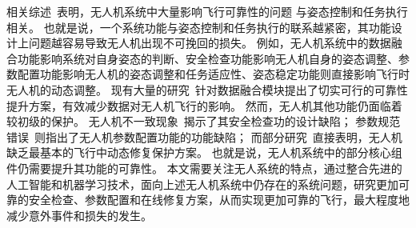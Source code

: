 相关综述~\cite{derhab2023internet,omolara2023drone}表明，无人机系统中大量影响飞行可靠性的问题
与姿态控制和任务执行相关。
也就是说，一个系统功能与姿态控制和任务执行的联系越紧密，其功能设计上问题越容易导致无人机出现不可挽回的损失。
例如，无人机系统中的数据融合功能影响系统对自身姿态的判断、安全检查功能影响无人机自身的姿态调整、参数配置功能影响无人机的姿态调整和任务适应性、姿态稳定功能则直接影响飞行时无人机的动态调整。
现有大量的研究~\cite{heredia2008sensor,quinonez2020savior,samy2008neural,fei2018cross,dash2021stealthy,sindhwani2020unsupervised,lu2017motor}针对数据融合模块提出了切实可行的可靠性提升方案，有效减少数据对无人机飞行的影响。
然而，无人机其他功能仍面临着较初级的保护。
无人机不一致现象~\cite{choi2020cyber}揭示了其安全检查功的设计缺陷；
参数规范错误~\cite{rvfuzzer,han2022control}则指出了无人机参数配置功能的功能缺陷；
而部分研究~\cite{choi2020software,dash2021pid}直接表明，无人机缺乏最基本的飞行中动态修复保护方案。
也就是说，无人机系统中的部分核心组件仍需要提升其功能的可靠性。
本文需要关注无人系统的特点，通过整合先进的人工智能和机器学习技术，面向上述无人机系统中仍存在的系统问题，研究更加可靠的安全检查、参数配置和在线修复方案，从而实现更加可靠的飞行，最大程度地减少意外事件和损失的发生。







